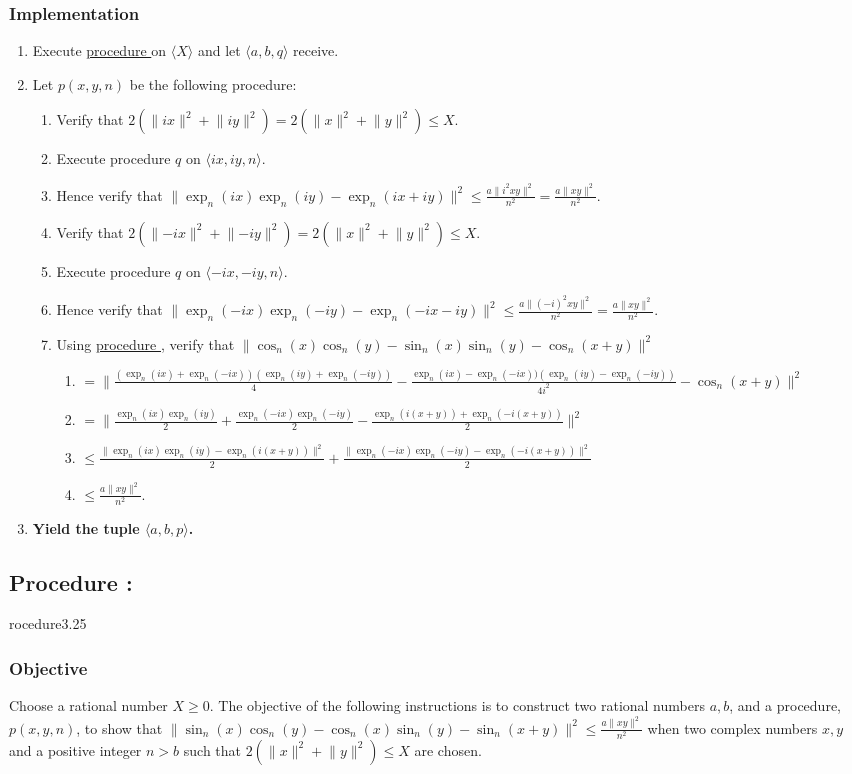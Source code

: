 \documentclass{article}
\newcounter{procedure}[part]
\newcommand{\procedure}[1]{\subsection*{Procedure \thepart:\theprocedure}\label{sec:procedure #1}\global\expandafter\edef\csname procedure#1\endcsname{\thepart:\theprocedure}\addtocounter{procedure}{1}}
\newcommand{\objective}{\subsubsection*{Objective}}
\newcommand{\implementation}{\subsubsection*{Implementation}}
\newcommand{\procedurehr}[1]{\hyperref[sec:procedure #1]{procedure \expandafter\csname procedure#1\endcsname}}
\begin{document}
\begin{multicols}{2}
			\implementation
				\begin{enumerate}
					\item Execute \procedurehr{3.15} on $\langle X\rangle$ and let $\langle a,b,q\rangle$ receive.
					\item Let $p(x,y,n)$ be the following procedure:
					\begin{enumerate}
						\item Verify that $2(\lVert ix\rVert^2+\lVert iy\rVert^2)=2(\lVert x\rVert^2+\lVert y\rVert^2)\le X$.
						\item Execute procedure $q$ on $\langle ix,iy,n\rangle$.
						\item Hence verify that $\lVert\exp_n(ix)\exp_n(iy)-\exp_n(ix+iy)\rVert^2\le\frac{a\lVert i^2xy\rVert^2}{n^2}=\frac{a\lVert xy\rVert^2}{n^2}$.
						\item Verify that $2(\lVert -ix\rVert^2+\lVert -iy\rVert^2)=2(\lVert x\rVert^2+\lVert y\rVert^2)\le X$.
						\item Execute procedure $q$ on $\langle -ix,-iy,n\rangle$.
						\item Hence verify that $\lVert\exp_n(-ix)\exp_n(-iy)-\exp_n(-ix-iy)\rVert^2\le\frac{a\lVert (-i)^2xy\rVert^2}{n^2}=\frac{a\lVert xy\rVert^2}{n^2}$.
						\item Using \procedurehr{3.04}, verify that $\lVert\cos_n(x)\cos_n(y)-\sin_n(x)\sin_n(y)-\cos_n(x+y)\rVert^2$
						\begin{enumerate}
							\item $=\lVert\frac{(\exp_n(ix)+\exp_n(-ix))(\exp_n(iy)+\exp_n(-iy))}{4}-\frac{\exp_n(ix)-\exp_n(-ix))(\exp_n(iy)-\exp_n(-iy))}{4i^2}-\cos_n(x+y)\rVert^2$
							\item $=\lVert\frac{\exp_n(ix)\exp_n(iy)}{2}+\frac{\exp_n(-ix)\exp_n(-iy)}{2}-\frac{\exp_n(i(x+y))+\exp_n(-i(x+y))}{2}\rVert^2$
							\item $\le\frac{\lVert\exp_n(ix)\exp_n(iy)-\exp_n(i(x+y))\rVert^2}{2}+\frac{\lVert\exp_n(-ix)\exp_n(-iy)-\exp_n(-i(x+y))\rVert^2}{2}$
							\item $\le\frac{a\lVert xy\rVert^2}{n^2}$.
						\end{enumerate}
					\end{enumerate}
					\item \textbf{Yield the tuple $\langle a,b,p\rangle$.}
				\end{enumerate}
		\procedure{3.25}
			\objective
				Choose a rational number $X\ge 0$. The objective of the following instructions is to construct two rational numbers $a,b$, and a procedure, $p(x,y,n)$, to show that $\lVert\sin_n(x)\cos_n(y)-\cos_n(x)\sin_n(y)-\sin_n(x+y)\rVert^2\le\frac{a\lVert xy\rVert^2}{n^2}$ when two complex numbers $x,y$ and a positive integer $n>b$ such that $2(\lVert x\rVert^2+\lVert y\rVert^2)\le X$ are chosen.

\end{multicols}
\end{document}
